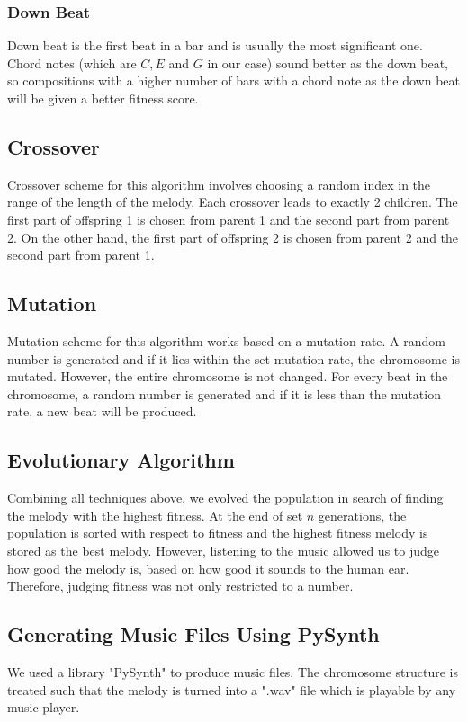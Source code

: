 \documentclass[conference]{IEEEtran}
\begin{document}
\subsubsection{Down Beat}
Down beat is the first beat in a bar and is usually the most significant one. Chord notes (which are $C, E$ and $G$ in our case) sound better as the down beat, so compositions with a higher number of bars with a chord note as the down beat will be given a better fitness score.

\subsection{Crossover}
Crossover scheme for this algorithm involves choosing a random index in the range of the length of the melody. Each crossover leads to exactly 2 children. The first part of offspring 1 is chosen from parent 1 and the second part from parent 2. On the other hand, the first part of offspring 2 is chosen from parent 2 and the second part from parent 1.

\subsection{Mutation}
Mutation scheme for this algorithm works based on a mutation rate. A random number is generated and if it lies within the set mutation rate, the chromosome is mutated. However, the entire chromosome is not changed. For every beat in the chromosome, a random number is generated and if it is less than the mutation rate, a new beat will be produced.

\subsection{Evolutionary Algorithm}
Combining all techniques above, we evolved the population in search of finding the melody with the highest fitness. At the end of set $n$ generations, the population is sorted with respect to fitness and the highest fitness melody is stored as the best melody. However, listening to the music allowed us to judge how good the melody is, based on how good it sounds to the human ear. Therefore, judging fitness was not only restricted to a number.

\subsection{Generating Music Files Using PySynth}
We used a library "PySynth" to produce music files. The chromosome structure is treated such that the melody is turned into a ".wav" file which is playable by any music player.
\end{document}
